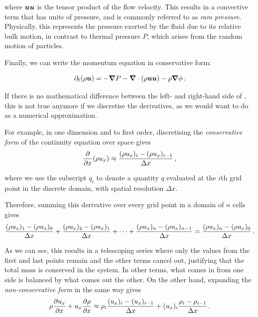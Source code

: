 where \(\boldsymbol{u} \boldsymbol{u}\) is the tensor product of the flow velocity. This results in a convective term that has units of pressure, and is commonly referred to as \emph{ram pressure}. Physically, this represents the pressure exerted by the fluid due to its relative bulk motion, in contrast to thermal pressure \(P\), which arises from the random motion of particles.

Finally, we can write the momentum equation in conservative form:
\begin{boxedeq}
    \begin{equation}
        \partial_t (\rho \boldsymbol{u}) = - \boldsymbol{\nabla} P - \boldsymbol{\nabla} \cdot (\rho \boldsymbol{u} \boldsymbol{u}) - \rho \boldsymbol{\nabla} \phi \,\mathrm{.} \label{eq:conservative_momentum}
    \end{equation}
\end{boxedeq}

If there is no mathematical difference between the left- and right-hand side of , this is not true anymore if we discretise the derivatives, as we would want to do as a numerical approximation.

For example, in one dimension and to first order, discretising the \emph{conservative form} of the continuity equation over space gives
\begin{equation}
    \frac{\partial}{\partial x} (\rho u_x) \approx \frac{(\rho u_x)_i - (\rho u_x)_{i-1}}{\Delta x} \,\mathrm{,}
\end{equation}

where we use the subscript \(q_i\) to denote a quantity \(q\) evaluated at the \(i\)th grid point in the discrete domain, with spatial resolution \(\Delta x\).

Therefore, summing this derivative over every grid point in a domain of \(n\) cells gives
\begin{equation}
    \frac{(\rho u_x)_1 - (\rho u_x)_0}{\Delta x} + \frac{(\rho u_x)_2 - (\rho u_x)_1}{\Delta x} + \cdots + \frac{(\rho u_x)_n - (\rho u_x)_{n-1}}{\Delta x} = \frac{(\rho u_x)_n - (\rho u_x)_0}{\Delta x} \,\mathrm{.}
\end{equation}

As we can see, this results in a telescoping series where only the values from the first and last points remain and the other terms cancel out, justifying that the total mass is conserved in the system. In other terms, what comes in from one side is balanced by what comes out the other. On the other hand, expanding the \emph{non-conservative form} in the same way gives
\begin{equation}
    \rho \frac{\partial u_x}{\partial x} + u_x \frac{\partial \rho}{\partial x} \approx \rho_i \frac{(u_x)_i - (u_x)_{i-1}}{\Delta x} + (u_x)_i \frac{\rho_i - \rho_{i-1}}{\Delta x} \,\mathrm{.}
\end{equation}


